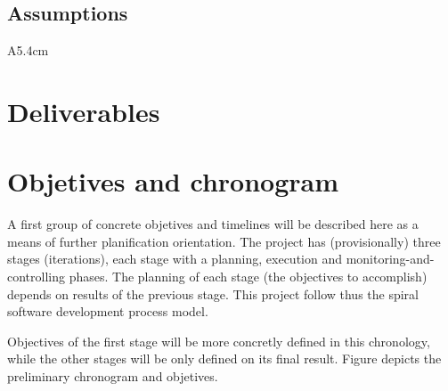 \documentclass[twocolumn]{article}
\begin{document}
\subsection{Assumptions}
\begin{condlist}{A}{5.4cm}
\end{condlist}


\section{Deliverables}

\section{Objetives and chronogram}
A first group of concrete objetives and timelines will be described
here as a means of further planification orientation. The project has
(provisionally) three stages (iterations), each stage with a planning,
execution and monitoring-and-controlling phases. The planning of each
stage (the objectives to accomplish) depends on results of the
previous stage. This project follow thus the spiral software
development process model.

Objectives of the first stage will be more concretly defined in this
chronology, while the other stages will be only defined on its final
result. Figure  depicts the preliminary chronogram and
objetives.
\end{document}
